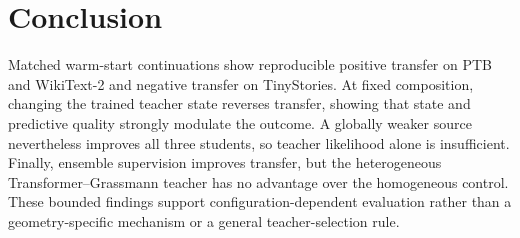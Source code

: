 \section{Conclusion}
\label{sec:conclusion}

Matched warm-start continuations show reproducible positive transfer on PTB and WikiText-2 and negative transfer on TinyStories. At fixed composition, changing the trained teacher state reverses transfer, showing that state and predictive quality strongly modulate the outcome. A globally weaker source nevertheless improves all three students, so teacher likelihood alone is insufficient. Finally, ensemble supervision improves transfer, but the heterogeneous Transformer--Grassmann teacher has no advantage over the homogeneous control. These bounded findings support configuration-dependent evaluation rather than a geometry-specific mechanism or a general teacher-selection rule.
